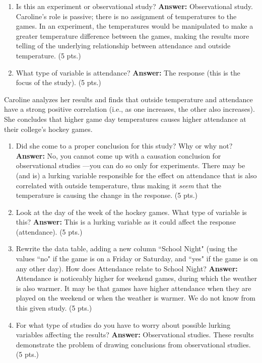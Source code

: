 \documentclass[11pt]{article}
\newcommand{\ben}{\begin{enumerate}}
\newcommand{\een}{\end{enumerate}}
\newcommand{\ans}[1]{{\color{blue} \textbf{Answer: } #1 (5 pts.)}}
\begin{document}
\ben 
\item Is this an experiment or observational study?
\ans{Observational study. Caroline's role is passive; 
there is no assignment of temperatures to the games.
In an experiment, the temperatures would be manipulated
to make a greater temperature difference between the games,
making the results more telling of the underlying relationship
between attendance and outside temperature.}

\item What type of variable is attendance?
\ans{The response (this is the focus of the study).}

\een

Caroline analyzes her results and finds that
outside temperature and attendance have a strong
positive correlation (i.e., as one increases, the other also increases).
She concludes that higher game day temperatures causes higher
attendance at their college's hockey games.

\ben
\addtocounter{enumii}{2}
\item Did she come to a proper conclusion for this study? Why or why not?
\ans{No, you cannot come up with a causation conclusion for observational studies%
---you can do so only for experiments. There may be (and is) a lurking variable responsible
for the effect on attendance that is also correlated with outside temperature,
thus making it \emph{seem} that the temperature is causing the change in
the response.}

\item Look at the day of the week of the hockey games.
What type of variable is this?
\ans{This is a lurking variable as it could affect the response (attendance). }
 
\item 
Rewrite the data table, adding a new column ``School Night" (using the values ``no" if the game is on a Friday or Saturday, and ``yes" if the game is on any other day).
How does Attendance relate to School Night?
\ans{Attendance is noticeably higher for weekend games, during which
the weather is also warmer. It may be that games have higher attendance
when they are played on the weekend or when the weather is warmer.
We do not know from this given study.}

\item For what type of studies do you have to worry
about possible lurking variables affecting the results?
\ans{Observational studies. 
These results demonstrate the problem of drawing conclusions from
observational studies.}
\een
\end{document}
